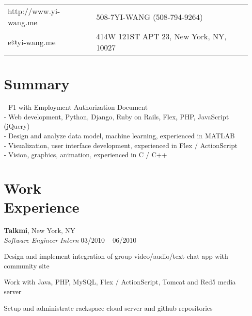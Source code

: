 \documentclass[margin,line]{resume}
\begin{document}
\begin{resume}

      \begin{tabular}{@{}p{6cm}p{8.5cm}}
      http://www.yi-wang.me  &  508-7YI-WANG (508-794-9264)           \\
      e@yi-wang.me             &  414W 121ST APT 23, New York, NY, 10027 \\
      \end{tabular}

 
    \section{\mysidestyle Summary}
      
      - F1 with Employment Authorization Document \\
      - Web development, Python, Django, Ruby on Rails, Flex, PHP, JavaScript (jQuery) \\
      - Design and analyze data model, machine learning, experienced in MATLAB \\
      - Visualization, user interface development, experienced in Flex / ActionScript \\
      - Vision, graphics, animation, experienced in C / C++
      

    \section{\mysidestyle Work \\ Experience}

    \textbf{Talkmi}, New York, NY \\
    \textsl{Software Engineer Intern} \hfill 03/2010 -- 06/2010 \vspace{-3mm}\\\vspace{-1mm}%
      \begin{list2}
      \item Design and implement integration of group video/audio/text chat app with community site
      \item Work with Java, PHP, MySQL, Flex / ActionScript, Tomcat and Red5 media server
      \item Setup and administrate rackspace cloud server and github repositories
      \end{list2}


\end{resume}
\end{document}
